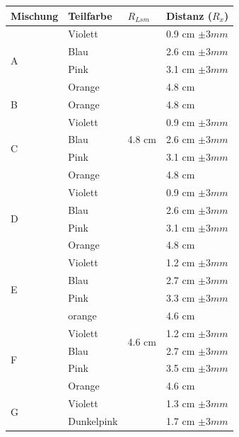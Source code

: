 \documentclass[11pt,paper=a4,final]{scrartcl}
\begin{document}
\begin{savenotes}
  \begin{table}[ht!]
    \centering
    \begin{tabular}{|l|l|l|l|}
      \hline
      \bf Mischung	& \bf Teilfarbe	& \bf \(R_{Lsm}\)		& \bf Distanz (\(R_x\))	\\ \hline
      \multirow{4}{*}{A}
			& Violett	& \multirow{13}{*}{4.8 cm }	& 0.9 cm \(\pm 3 mm \)	\\
      			& Blau		& 				& 2.6 cm \(\pm 3 mm \)	\\
      			& Pink		&				& 3.1 cm \(\pm 3 mm \)	\\
      			& Orange	&				& 4.8 cm 		\\ \cline{1-2} \cline{4-4}
       B		& Orange	&				& 4.8 cm		\\ \cline{1-2} \cline{4-4}
      \multirow{4}{*}{C}
			& Violett	& 				& 0.9 cm \(\pm 3 mm \)	\\
      			& Blau		& 				& 2.6 cm \(\pm 3 mm \)	\\
      			& Pink		&				& 3.1 cm \(\pm 3 mm \)	\\
      			& Orange	&				& 4.8 cm 		\\ \cline{1-2} \cline{4-4}
      \multirow{4}{*}{D}
			& Violett	&				& 0.9 cm \(\pm 3 mm \)	\\
      			& Blau		& 				& 2.6 cm \(\pm 3 mm \)	\\
      			& Pink		&				& 3.1 cm \(\pm 3 mm \)	\\
      			& Orange	&				& 4.8 cm 		\\ \hline
      \multirow{4}{*}{E}
			& Violett	& \multirow{18}{*}{4.6 cm }	& 1.2 cm \(\pm 3 mm \)	\\
      			& Blau		& 				& 2.7 cm \(\pm 3 mm \)	\\
      			& Pink		&				& 3.3 cm \(\pm 3 mm \)	\\
			      & orange	&				& 4.6 cm 		\\ \cline{1-2} \cline{4-4}
      \multirow{4}{*}{F}
			& Violett	&				& 1.2 cm \(\pm 3 mm \)	\\
      			& Blau		& 				& 2.7 cm \(\pm 3 mm \)	\\
      			& Pink		&				& 3.5 cm \(\pm 3 mm \)	\\
			& Orange	&				& 4.6 cm 		\\ \cline{1-2} \cline{4-4}
      \multirow{5}{*}{G}
			& Violett	&				& 1.3 cm \(\pm 3 mm \)	\\
      			& Dunkelpink 	&				& 1.7 cm \(\pm 3 mm \)	\\

\end{tabular}
\end{table}
\end{savenotes}
\end{document}
